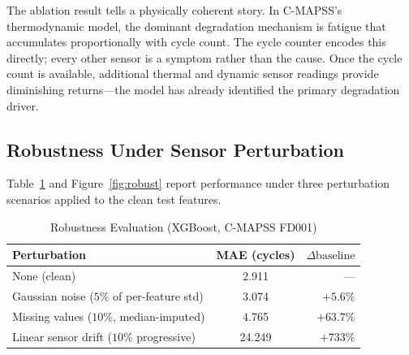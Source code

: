 \documentclass[10pt, journal, letterpaper]{IEEEtran}
\begin{document}
The ablation result tells a physically coherent story. In C-MAPSS's
thermodynamic model, the dominant degradation mechanism is fatigue that
accumulates proportionally with cycle count. The cycle counter encodes this
directly; every other sensor is a symptom rather than the cause. Once the
cycle count is available, additional thermal and dynamic sensor readings
provide diminishing returns—the model has already identified the primary
degradation driver.

\subsection{Robustness Under Sensor Perturbation}

Table~\ref{tab:robust} and Figure~\ref{fig:robust} report performance under
three perturbation scenarios applied to the clean test features.

\begin{table}[htbp]
\caption{Robustness Evaluation (XGBoost, C-MAPSS FD001)}
\label{tab:robust}
\centering\small
\begin{tabular}{lcr}
\toprule
\textbf{Perturbation} & \textbf{MAE (cycles)} & $\Delta\mathrm{baseline}$ \\
\midrule
None (clean)                               & 2.911  & --- \\
Gaussian noise ($5\%$ of per-feature std)  & 3.074  & $+5.6\%$ \\
Missing values ($10\%$, median-imputed)    & 4.765  & $+63.7\%$ \\
Linear sensor drift ($10\%$ progressive)   & 24.249 & $+733\%$ \\
\bottomrule
\end{tabular}
\end{table}
\end{document}
